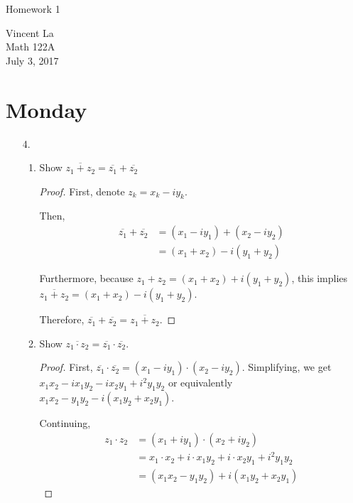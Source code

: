 \documentclass[11pt]{article}
\title{ }
\begin{document}
	\begin{center}	%
		\Large{Homework 1}	%
	\end{center}
	\begin{center}
		Vincent La \\
		Math 122A \\
		July 3, 2017
	\end{center}

\section*{Monday}
\begin{enumerate}
	\item[4.]
		\begin{enumerate}
			\item Show $\overline{z_1 + z_2} = \overline{z_1} + \overline{z_2}$
			
			\begin{proof}
				First, denote $z_k = x_k - iy_k$.
				
				Then, 
				\[\begin{aligned}
				\overline{z_1} + \overline{z_2}
				&= (x_1 - iy_1) + (x_2 - iy_2) \\
				&= (x_1 + x_2) -i(y_1 + y_2)
				\end{aligned}
				\]
				
				Furthermore, because $z_1 + z_2 = (x_1 + x_2) + i(y_1 + y_2)$, this implies
				$\overline{z_1 + z_2} = (x_1 + x_2) - i(y_1 + y_2)$.
				
				Therefore, $\overline{z_1} + \overline{z_2} = \overline{z_1 + z_2}$.
			\end{proof}
			
			\item Show $\overline{z_1\cdot z_2} = \overline{z_1} \cdot \overline{z_2}$. 
			
			\begin{proof}
				First, $\overline{z_1} \cdot \overline{z_2} = (x_1 - iy_1) \cdot (x_2 - iy_2)$. Simplifying, we get $x_1x_2 - ix_1y_2 - ix_2y_1 + i^2y_1y_2$ or equivalently $x_1x_2 - y_1y_2 - i(x_1y_2 + x_2y_1)$.
				
				\bigskip
				
				Continuing,
				\[\begin{aligned}
				z_1 \cdot z_2
				&= (x_1 + iy_1) \cdot (x_2 + iy_2) \\
				&= x_1\cdot x_2 + i\cdot x_1y_2 + i\cdot x_2y_1 + i^2 y_1y_2 \\
				&= (x_1x_2 - y_1y_2) + i(x_1y_2 + x_2y_1)
				\end{aligned}				
				\]
				

\end{proof}
\end{enumerate}
\end{enumerate}
\end{document}
